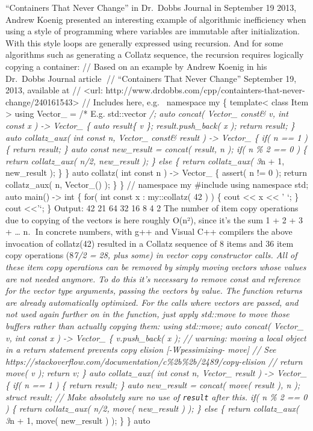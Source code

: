 ``Containers That Never Change'' in Dr.~Dobbs Journal in September 19
2013, Andrew Koenig presented an interesting example of algorithmic
ineﬃciency when using a style of programming where variables are
immutable after initialization. With this style loops are generally
expressed using recursion. And for some algorithms such as generating a
Collatz sequence, the recursion requires logically copying a container:
// Based on an example by Andrew Koenig in his Dr.~Dobbs Journal article
// ``Containers That Never Change'' September 19, 2013, available at //
\textless url:
http://www.drdobbs.com/cpp/containters-that-never-change/240161543\textgreater{}
// Includes here, e.g.~ namespace my \{ template\textless{} class Item
\textgreater{} using Vector\_ = /* E.g. std::vector \emph{/; auto
concat( Vector\_ const\& v, int const x ) -\textgreater{} Vector\_ \{
auto result\{ v \}; result.push\_back( x ); return result; \} auto
collatz\_aux( int const n, Vector\_ const\& result ) -\textgreater{}
Vector\_ \{ if( n == 1 ) \{ return result; \} auto const new\_result =
concat( result, n ); if( n \% 2 == 0 ) \{ return collatz\_aux( n/2,
new\_result ); \} else \{ return collatz\_aux( 3}n + 1, new\_result );
\} \} auto collatz( int const n ) -\textgreater{} Vector\_ \{ assert( n
!= 0 ); return collatz\_aux( n, Vector\_() ); \} \} // namespace my
\#include using namespace std; auto main() -\textgreater{} int \{ for(
int const x : my::collatz( 42 ) ) \{ cout \textless\textless{} x
\textless\textless{} ' `; \} cout \textless\textless{}'\n`; \} Output:
42 21 64 32 16 8 4 2 The number of item copy operations due to copying
of the vectors is here roughly O(n²), since it's the sum 1 + 2 + 3 +
\ldots{} n. In concrete numbers, with g++ and Visual C++ compilers the
above invocation of collatz(42) resulted in a Collatz sequence of 8
items and 36 item copy operations (8\emph{7/2 = 28, plus some) in vector
copy constructor calls. All of these item copy operations can be removed
by simply moving vectors whose values are not needed anymore. To do this
it's necessary to remove const and reference for the vector type
arguments, passing the vectors by value. The function returns are
already automatically optimized. For the calls where vectors are passed,
and not used again further on in the function, just apply std::move to
move those buﬀers rather than actually copying them: using std::move;
auto concat( Vector\_ v, int const x ) -\textgreater{} Vector\_ \{
v.push\_back( x ); // warning: moving a local object in a return
statement prevents copy elision {[}-Wpessimizing- move{]} // See
https://stackoverflow.com/documentation/c\%2b\%2b/2489/copy-elision //
return move( v ); return v; \} auto collatz\_aux( int const n, Vector\_
result ) -\textgreater{} Vector\_ \{ if( n == 1 ) \{ return result; \}
auto new\_result = concat( move( result ), n ); struct result; // Make
absolutely sure no use of \passthrough{\lstinline!result!} after this.
if( n \% 2 == 0 ) \{ return collatz\_aux( n/2, move( new\_result ) ); \}
else \{ return collatz\_aux( 3}n + 1, move( new\_result ) ); \} \} auto
